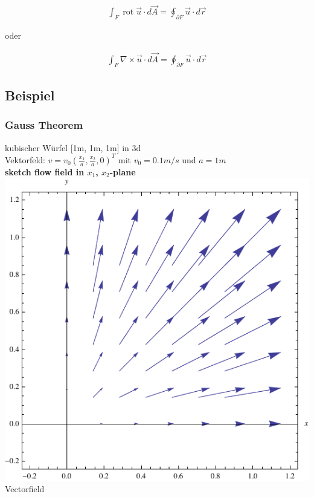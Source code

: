 \documentclass[a4paper, 10pt]{scrartcl}
\begin{document}
	\begin{align}
		\int_{F} \operatorname{rot} \vec u \cdot d \vec A =
		\oint_{\partial F} \vec u \cdot d \vec r
	\end{align}
	
	oder
	
	\begin{align}
		\int_{F} \nabla \times \vec u \cdot d \vec A =
		\oint_{\partial F} \vec u \cdot d \vec r
	\end{align}
	
	\subsection{Beispiel} %
	
	\subsubsection{Gauss Theorem}
	kubischer Würfel [1m, 1m, 1m] in 3d\\
	Vektorfeld: $v = v_0 (\frac{x_1}{a}, \frac{x_2}{a}, 0)^T$ mit $v_0 = 0.1 m/s$
	und $a = 1m$\\
	
	\textbf{sketch flow field in $x_1$, $x_2$-plane}\\
	
	\includegraphics[scale=1.0]{images/gauss.pdf}\\ %
	Vectorfield\\
	
\end{document}
